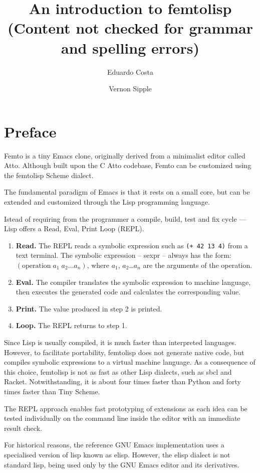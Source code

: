 \documentclass[a4paper,12pt]{book}
\title{An introduction to femtolisp\\
{\normalsize (Content not checked for grammar and spelling errors)}}
\author{Eduardo Costa \and Vernon Sipple}
\date{}
\begin{document}
\maketitle
\thispagestyle{empty}

\frontmatter

\chapter*{Preface}

Femto is a tiny Emacs clone,
originally derived from a minimalist
editor called Atto. Although built
upon the C Atto codebase, Femto can
be customized using the femtolisp Scheme dialect.

The fundamental paradigm of Emacs is that it
rests on a small core, but can be
extended and customized through
the Lisp programming language.

Istead of requiring from the programmer a compile,
build, test and fix cycle ---
Lisp offers a Read, Eval, Print Loop (REPL).
\begin{enumerate}
\item {\bf Read.} The REPL reads
a symbolic expression 
such as \verb|(+ 42 13 4)| from
a text terminal. The symbolic expression -- sexpr --
always has the form: $(\textrm{operation}\;a_1\;a_2\ldots a_n)$,
where $a_1$, $a_2$\ldots $a_n$ are the arguments of
the operation.
\item {\bf Eval.} The compiler translates the symbolic
expression to machine language, then executes the
generated code and calculates the corresponding
value.
\item {\bf Print.} The value produced in step 2 is printed.
\item {\bf Loop.} The REPL returns to step 1.
\end{enumerate}

Since Lisp is usually compiled, it is
much faster than interpreted languages.
However, to facilitate portability,
femtolisp does not generate
native code, but compiles symbolic expressions
to a virtual machine language. As a consequence of
this choice, femtolisp is not as fast as other
Lisp dialects, such as sbcl and Racket. Notwithstanding,
it is about four times faster than Python
and forty times faster than Tiny Scheme.

The REPL approach enables fast prototyping
of extensions as each idea can be tested
individually on the command line inside
the editor with an immediate result check.

For historical reasons, the reference GNU
Emacs implementation uses a specialised version of
lisp known as elisp.  However, the elisp
dialect is not standard lisp, being used
only by the GNU Emacs editor and its
derivatives.
\end{document}
